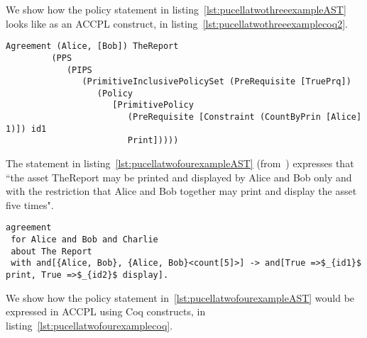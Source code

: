 We show how the policy statement in listing~\ref{lst:pucellatwothreeexampleAST} looks like as an \ac{ACCPL} construct, in listing~\ref{lst:pucellatwothreeexamplecoq2}.

\begin{minipage}[c]{0.95\textwidth}
\begin{lstlisting}
Agreement (Alice, [Bob]) TheReport
         (PPS
            (PIPS
               (PrimitiveInclusivePolicySet (PreRequisite [TruePrq])
                  (Policy
                     [PrimitivePolicy
                        (PreRequisite [Constraint (CountByPrin [Alice] 1)]) id1
                        Print]))))
\end{lstlisting}
\end{minipage} 

%


The statement in listing~\ref{lst:pucellatwofourexampleAST} (from~\cite{pucella2006}) expresses that ``the asset TheReport may be printed and displayed by Alice and Bob only and with the restriction that Alice and Bob together may print and display the asset five times".

\lstset{language=Pucella2006}
\begin{minipage}[c]{0.95\textwidth}
\begin{lstlisting}[frame=single, caption={Agreement of Example 2.4}, label={lst:pucellatwofourexampleAST}, mathescape]
agreement
 for Alice and Bob and Charlie
 about The Report 
 with and[{Alice, Bob}, {Alice, Bob}<count[5]>] -> and[True =>$_{id1}$ print, True =>$_{id2}$ display].
\end{lstlisting}
\end{minipage} 

We show how the policy statement in~\ref{lst:pucellatwofourexampleAST} would be expressed in \ac{ACCPL} using Coq constructs, in listing~\ref{lst:pucellatwofourexamplecoq}.

